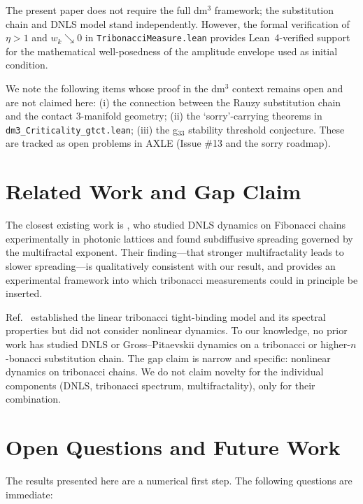 \documentclass[12pt,a4paper]{article}
\begin{document}
The present paper does not require the full dm$^3$ framework; the substitution
chain and DNLS model stand independently. However, the formal verification of
$\eta > 1$ and $w_k \searrow 0$ in \texttt{TribonacciMeasure.lean}
\cite{AXLE2026} provides Lean~4-verified support for the mathematical
well-posedness of the amplitude envelope used as initial condition.

We note the following items whose proof in the dm$^3$ context remains open
and are not claimed here: (i) the connection between the Rauzy substitution
chain and the contact 3-manifold geometry; (ii) the `sorry'-carrying theorems
in \texttt{dm3\_Criticality\_gtct.lean}; (iii) the g$_{33}$ stability
threshold conjecture. These are tracked as open problems in AXLE
\cite{AXLE2026} (Issue \#13 and the sorry roadmap).

\section{Related Work and Gap Claim}

The closest existing work is \cite{Lahini2009}, who studied DNLS dynamics on
Fibonacci chains experimentally in photonic lattices and found subdiffusive
spreading governed by the multifractal exponent. Their finding---that stronger
multifractality leads to slower spreading---is qualitatively consistent with
our result, and provides an experimental framework into which tribonacci
measurements could in principle be inserted.

Ref.~\cite{Krebbekx2023} established the linear tribonacci tight-binding
model and its spectral properties but did not consider nonlinear dynamics.
To our knowledge, no prior work has studied DNLS or Gross--Pitaevskii
dynamics on a tribonacci or higher-$n$-bonacci substitution chain. The gap
claim is narrow and specific: nonlinear dynamics on tribonacci chains. We do
not claim novelty for the individual components (DNLS, tribonacci spectrum,
multifractality), only for their combination.

\section{Open Questions and Future Work}

The results presented here are a numerical first step. The following questions
are immediate:
\end{document}
